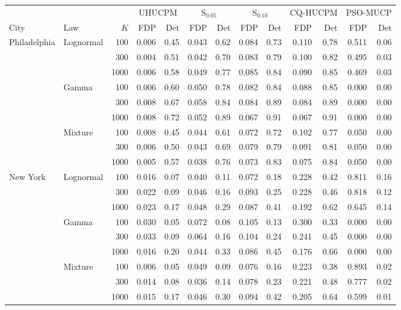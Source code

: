 \begin{tabular}{@{}llrrrrrrrrrrr@{}}
\toprule
 & & & \multicolumn{2}{c}{UHUCPM} & \multicolumn{2}{c}{S$_{0.05}$} & \multicolumn{2}{c}{S$_{0.10}$} & \multicolumn{2}{c}{CQ-HUCPM} & \multicolumn{2}{c}{PSO-MUCP} \\
\cmidrule(lr){4-5} \cmidrule(lr){6-7} \cmidrule(lr){8-9} \cmidrule(lr){10-11} \cmidrule(lr){12-13}
City & Law & $K$ & FDP & Det & FDP & Det & FDP & Det & FDP & Det & FDP & Det \\
\midrule
Philadelphia & Lognormal & 100 & 0.006 & 0.45 & 0.043 & 0.62 & 0.084 & 0.73 & 0.110 & 0.78 & 0.511 & 0.06 \\
 &  & 300 & 0.004 & 0.51 & 0.042 & 0.70 & 0.083 & 0.79 & 0.100 & 0.82 & 0.495 & 0.03 \\
 &  & 1000 & 0.006 & 0.58 & 0.049 & 0.77 & 0.085 & 0.84 & 0.090 & 0.85 & 0.469 & 0.03 \\
\addlinespace[1pt]
 & Gamma & 100 & 0.006 & 0.60 & 0.050 & 0.78 & 0.082 & 0.84 & 0.088 & 0.85 & 0.000 & 0.00 \\
 &  & 300 & 0.008 & 0.67 & 0.058 & 0.84 & 0.084 & 0.89 & 0.084 & 0.89 & 0.000 & 0.00 \\
 &  & 1000 & 0.008 & 0.72 & 0.052 & 0.89 & 0.067 & 0.91 & 0.067 & 0.91 & 0.000 & 0.00 \\
\addlinespace[1pt]
 & Mixture & 100 & 0.008 & 0.45 & 0.044 & 0.61 & 0.072 & 0.72 & 0.102 & 0.77 & 0.050 & 0.00 \\
 &  & 300 & 0.006 & 0.50 & 0.043 & 0.69 & 0.079 & 0.79 & 0.091 & 0.81 & 0.050 & 0.00 \\
 &  & 1000 & 0.005 & 0.57 & 0.038 & 0.76 & 0.073 & 0.83 & 0.075 & 0.84 & 0.050 & 0.00 \\
\midrule
New York & Lognormal & 100 & 0.016 & 0.07 & 0.040 & 0.11 & 0.072 & 0.18 & 0.228 & 0.42 & 0.811 & 0.16 \\
 &  & 300 & 0.022 & 0.09 & 0.046 & 0.16 & 0.093 & 0.25 & 0.228 & 0.46 & 0.818 & 0.12 \\
 &  & 1000 & 0.023 & 0.17 & 0.048 & 0.29 & 0.087 & 0.41 & 0.192 & 0.62 & 0.645 & 0.14 \\
\addlinespace[1pt]
 & Gamma & 100 & 0.030 & 0.05 & 0.072 & 0.08 & 0.105 & 0.13 & 0.300 & 0.33 & 0.000 & 0.00 \\
 &  & 300 & 0.033 & 0.09 & 0.064 & 0.16 & 0.104 & 0.24 & 0.241 & 0.45 & 0.000 & 0.00 \\
 &  & 1000 & 0.016 & 0.20 & 0.044 & 0.33 & 0.086 & 0.45 & 0.176 & 0.66 & 0.000 & 0.00 \\
\addlinespace[1pt]
 & Mixture & 100 & 0.006 & 0.05 & 0.049 & 0.09 & 0.076 & 0.16 & 0.223 & 0.38 & 0.893 & 0.02 \\
 &  & 300 & 0.014 & 0.08 & 0.036 & 0.14 & 0.078 & 0.23 & 0.221 & 0.48 & 0.777 & 0.02 \\
 &  & 1000 & 0.015 & 0.17 & 0.046 & 0.30 & 0.094 & 0.42 & 0.205 & 0.64 & 0.599 & 0.01 \\
\bottomrule
\end{tabular}
